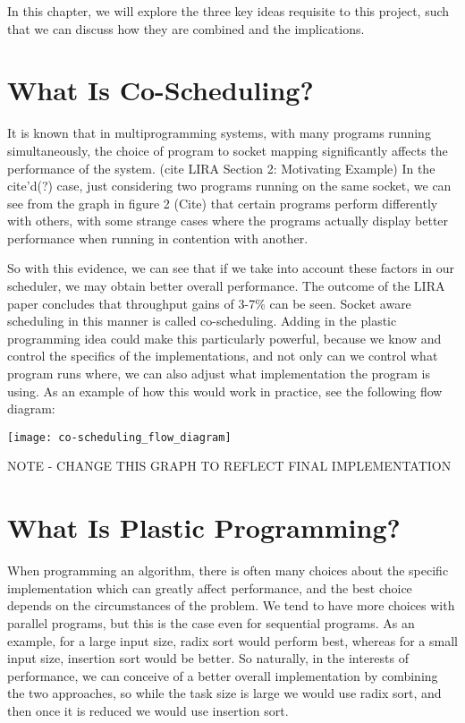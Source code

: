 
In this chapter, we will explore the three key ideas requisite to this project, such that we can discuss how they are combined and the implications.

\section{What Is Co-Scheduling?}

It is known that in multiprogramming systems, with many programs running simultaneously, the choice of program to socket mapping significantly affects the performance of the system. (cite LIRA Section 2: Motivating Example) In the cite'd(?) case, just considering two programs running on the same socket, we can see from the graph in figure 2 (Cite) that certain programs perform differently with others, with some strange cases where the programs actually display better performance when running in contention with another.

So with this evidence, we can see that if we take into account these factors in our scheduler, we may obtain better overall performance. The outcome of the LIRA paper concludes that throughput gains of 3-7\% can be seen. Socket aware scheduling in this manner is called co-scheduling. Adding in the plastic programming idea could make this particularly powerful, because we know and control the specifics of the implementations, and not only can we control what program runs where, we can also adjust what implementation the program is using. As an example of how this would work in practice, see the following flow diagram:

\begin{center}
\vspace{0.5cm}
\texttt{[image: co-scheduling\_flow\_diagram]}
\end{center}

NOTE - CHANGE THIS GRAPH TO REFLECT FINAL IMPLEMENTATION

\section{What Is Plastic Programming?}

When programming an algorithm, there is often many choices about the specific implementation which can greatly affect performance, and the best choice depends on the circumstances of the problem. We tend to have more choices with parallel programs, but this is the case even for sequential programs. As an example, for a large input size, radix sort would perform best, whereas for a small input size, insertion sort would be better. So naturally, in the interests of performance, we can conceive of a better overall implementation by combining the two approaches, so while the task size is large we would use radix sort, and then once it is reduced we would use insertion sort. 

